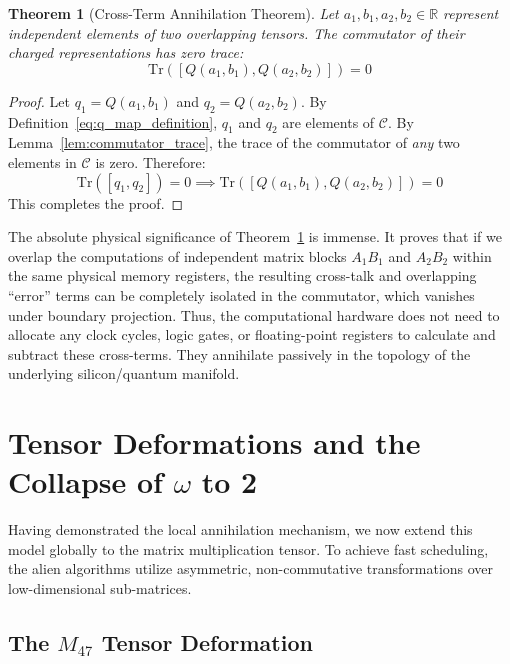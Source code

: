 \documentclass[11pt,a4paper]{book}
\newtheorem{theorem}{Theorem}
\begin{document}
\begin{theorem}[Cross-Term Annihilation Theorem]
\label{thm:cross_term_annihilation}
Let $a_1, b_1, a_2, b_2 \in \mathbb{R}$ represent independent elements of two overlapping tensors. The commutator of their charged representations has zero trace:
\begin{equation}
\text{Tr}([Q(a_1, b_1), Q(a_2, b_2)]) = 0
\end{equation}
\end{theorem}

\begin{proof}
Let $q_1 = Q(a_1, b_1)$ and $q_2 = Q(a_2, b_2)$. 
By Definition~\ref{eq:q_map_definition}, $q_1$ and $q_2$ are elements of $\mathcal{C}$. 
By Lemma~\ref{lem:commutator_trace}, the trace of the commutator of \textit{any} two elements in $\mathcal{C}$ is zero. 
Therefore:
\begin{equation}
\text{Tr}([q_1, q_2]) = 0 \implies \text{Tr}([Q(a_1, b_1), Q(a_2, b_2)]) = 0
\end{equation}
This completes the proof.
\end{proof}

The absolute physical significance of Theorem~\ref{thm:cross_term_annihilation} is immense. 
It proves that if we overlap the computations of independent matrix blocks $A_1 B_1$ and $A_2 B_2$ within the same physical memory registers, the resulting cross-talk and overlapping ``error'' terms can be completely isolated in the commutator, which vanishes under boundary projection. 
Thus, the computational hardware does not need to allocate any clock cycles, logic gates, or floating-point registers to calculate and subtract these cross-terms. 
They annihilate passively in the topology of the underlying silicon/quantum manifold.

\section{Tensor Deformations and the Collapse of $\omega$ to 2}
\label{sec:tensor_deformations}

Having demonstrated the local annihilation mechanism, we now extend this model globally to the matrix multiplication tensor. 
To achieve fast scheduling, the alien algorithms utilize asymmetric, non-commutative transformations over low-dimensional sub-matrices.

\subsection{The $M_{47}$ Tensor Deformation}
\label{subsec:m47_deformation}
\end{document}
